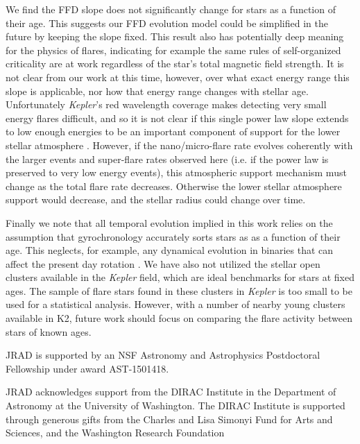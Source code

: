 \documentclass[preprint2]{aastex62}
\newcommand{\Kepler}{\textsl{Kepler}\xspace}
\begin{document}
We find the FFD slope does not significantly change for stars as a function of their age. This suggests our FFD evolution model could be simplified in the future by keeping the slope fixed. This result also has potentially deep meaning for the physics of flares, indicating for example the same rules of self-organized criticality are at work regardless of the star's total magnetic field strength. It is not clear from our work at this time, however, over what exact energy range this slope is applicable, nor how that energy range changes with stellar age. Unfortunately \Kepler's red wavelength coverage makes detecting very small energy flares difficult, and so it is not clear if this single power law slope extends to low enough energies to be an important component of support for the lower stellar atmosphere \citep[e.g. ``Ellerman Bombs'';][]{hansteen2017}. 
However, if the nano/micro-flare rate evolves coherently with the larger events and super-flare rates observed here (i.e. if the power law is preserved to very low energy events), this atmospheric support mechanism must change as the total flare rate decreases. Otherwise the lower stellar atmosphere support would decrease, and the stellar radius could change over time.

Finally we note that all temporal evolution implied in this work relies on the assumption that gyrochronology accurately sorts stars as as a function of their age. This neglects, for example, any dynamical evolution in binaries that can affect the present day rotation \citep[e.g.][]{lurie2017,clarke2018}. We have also not utilized the stellar open clusters available in the \Kepler field, which are ideal benchmarks for stars at fixed ages. The sample of flare stars found in these clusters in \Kepler is too small to be used for a statistical analysis. However, with a number of nearby young clusters available in K2, future work should focus on comparing the flare activity between stars of known ages.





\acknowledgments
JRAD is supported by an NSF Astronomy and Astrophysics Postdoctoral Fellowship under award AST-1501418.

JRAD acknowledges support from the DIRAC Institute in the Department of Astronomy at the University of Washington. The DIRAC Institute is supported through generous gifts from the Charles and Lisa Simonyi Fund for Arts and Sciences, and the Washington Research Foundation
\end{document}
